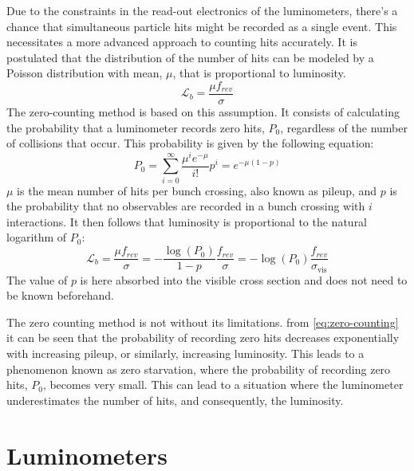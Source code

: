Due to the constraints in the read-out electronics of the luminometers, there's a chance that simultaneous particle hits might be recorded as a single event. This necessitates a more advanced approach to counting hits accurately. It is postulated that the distribution of the number of hits can be modeled by a Poisson distribution \cite{TheLHCbcollaboration_2014} with mean, $\mu$, that is proportional to luminosity.
\begin{equation}
    \label{eq:luminosity-from-hits}
    \mathcal{L}_b = \frac{\mu f_{rev}}{\sigma}
\end{equation}
The zero-counting method is based on this assumption. It consists of calculating the probability that a luminometer records zero hits, $P_0$, regardless of the number of collisions that occur. This probability is given by the following equation:
\begin{equation}
    \label{eq:zero-counting}
    P_0 = \sum_{i=0}^{\infty} \frac{\mu^i e^{-\mu}}{i!} p^i = e^{-\mu(1-p)}
\end{equation}
$\mu$ is the mean number of hits per bunch crossing, also known as pileup, and $p$ is the probability that no observables are recorded in a bunch crossing with $i$ interactions. It then follows that luminosity is proportional to the natural logarithm of $P_0$:
\begin{equation}
    \label{eq:luminosity-from-hits-2}
    \mathcal{L}_b = \frac{\mu f_{rev}}{\sigma} = - \frac{\log (P_0)}{1-p} \frac{f_{rev}}{\sigma} = - \log (P_0) \frac{f_{rev}}{\sigma_{\mathrm{vis}}}
\end{equation}
The value of $p$ is here absorbed into the visible cross section \cite{Sirunyan:2759951} and does not need to be known beforehand.

The zero counting method is not without its limitations. from \autoref{eq:zero-counting} it can be seen that the probability of recording zero hits decreases exponentially with increasing pileup, or similarly, increasing luminosity. This leads to a phenomenon known as zero starvation, where the probability of recording zero hits, $P_0$, becomes very small. This can lead to a situation where the luminometer underestimates the number of hits, and consequently, the luminosity.


\section{Luminometers}
\label{subsec:luminosity_detectors}

